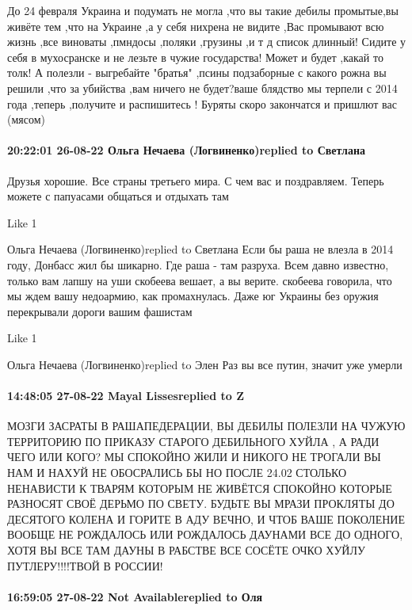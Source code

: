 До 24 февраля Украина и подумать не могла ,что вы такие дебилы промытые,вы
живёте тем ,что на Украине ,а у себя нихрена не видите ,Вас промывают всю жизнь
,все виноваты ,пмндосы ,поляки ,грузины ,и т д список длинный! Сидите у себя в
мухосранске и не лезьте в чужие государства! Может и будет ,какай то толк! А
полезли - выгребайте "братья" ,псины подзаборные с какого рожна вы решили ,что
за убийства ,вам ничего не будет?ваше блядство мы терпели с 2014 года ,теперь
,получите и распишитесь ! Буряты скоро закончатся и пришлют вас (мясом)


\paragraph{20:22:01 26-08-22 Ольга Нечаева (Логвиненко)replied to Светлана}

Друзья хорошие. Все страны третьего мира. С чем вас и поздравляем. Теперь
можете с папуасами общаться и отдыхать там

    Like 1

Ольга Нечаева (Логвиненко)replied to Светлана
Если бы раша не влезла в 2014 году, Донбасс жил бы шикарно. Где раша - там разруха. Всем давно известно, только вам лапшу на уши скобеева вешает, а вы верите. скобеева говорила, что мы ждем вашу недоармию, как промахнулась. Даже юг Украины без оружия перекрывали дороги вашим фашистам

    Like 1

Ольга Нечаева (Логвиненко)replied to Элен
Раз вы все путин, значит уже умерли

\paragraph{14:48:05 27-08-22 Mayal Lissesreplied to Z}

МОЗГИ ЗАСРАТЫ В РАШАПЕДЕРАЦИИ, ВЫ ДЕБИЛЫ ПОЛЕЗЛИ НА ЧУЖУЮ ТЕРРИТОРИЮ ПО ПРИКАЗУ
СТАРОГО ДЕБИЛЬНОГО ХУЙЛА , А РАДИ ЧЕГО ИЛИ КОГО? МЫ СПОКОЙНО ЖИЛИ И НИКОГО НЕ
ТРОГАЛИ ВЫ НАМ И НАХУЙ НЕ ОБОСРАЛИСЬ БЫ НО ПОСЛЕ 24.02 СТОЛЬКО НЕНАВИСТИ К
ТВАРЯМ КОТОРЫМ НЕ ЖИВЁТСЯ СПОКОЙНО КОТОРЫЕ РАЗНОСЯТ СВОЁ ДЕРЬМО ПО СВЕТУ.
БУДЬТЕ ВЫ МРАЗИ ПРОКЛЯТЫ ДО ДЕСЯТОГО КОЛЕНА И ГОРИТЕ В АДУ ВЕЧНО, И ЧТОБ ВАШЕ
ПОКОЛЕНИЕ ВООБЩЕ НЕ РОЖДАЛОСЬ ИЛИ РОЖДАЛОСЬ ДАУНАМИ ВСЕ ДО ОДНОГО, ХОТЯ ВЫ ВСЕ
ТАМ ДАУНЫ В РАБСТВЕ ВСЕ СОСЁТЕ ОЧКО ХУЙЛУ ПУТЛЕРУ!!!!ТВОЙ В РОССИИ!

\paragraph{16:59:05 27-08-22 Not Availablereplied to Оля}


